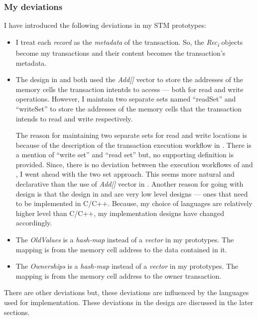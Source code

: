 \documentclass[../main]{subfiles}
\begin{document}
  \subsubsection{My deviations}
  
  \par
  I have introduced the following deviations in my STM prototypes: \par
  \begin{itemize}
    \item I treat each {\em record} as the {\em metadata} of the transaction. So, the {\em Rec\textsubscript{i}} objects become my transactions and their content becomes the transaction's metadata.

    \item The design in \cite{Shavit1997} and \cite{weimerskirch2008software} both used the {\em Add[]} vector to store the addresses of the memory cells the transaction intentds to access --- both for read and write operations. However, I maintain two separate sets named ``readSet'' and ``writeSet'' to store the addresses of the memory cells that the transaction intends to read and write respectively. \par

    The reason for maintaining two separate sets for read and write locations is because of the description of the transaction execution workflow in \cite{weimerskirch2008software}. There is a mention of ``write set'' and ``read set'' but, no supporting definition is provided. Since, there is no deviation between the execution workflows of \cite{Shavit1997} and \cite{weimerskirch2008software}, I went ahead with the two set approach. This seems more natural and declarative than the use of {\em Add[]} vector in \cite{Shavit1997}. Another reason for going with design is that the design in \cite{Shavit1997} and \cite{weimerskirch2008software} are very low level designs --- ones that need to be implemented in C/C++. Because, my choice of languages are relatively higher level than C/C++, my implementation designs have changed accordingly. \par

    \item The {\em OldValues} is a {\em hash-map} instead of a {\em vector} in my prototypes. The mapping is from the memory cell address to the data contained in it.

    \item The {\em Ownerships} is a {\em hash-map} instead of a {\em vector} in my prototypes. The mapping is from the memory cell address to the owner transaction.
  \end{itemize}

  \par
  There are other deviations but, these deviations are influenced by the languages used for implementation. These deviations in the design are discussed in the later sections. \par
\end{document}
